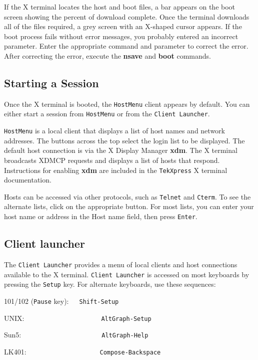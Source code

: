 \documentclass[11pt]{article}
\begin{document}
If the X terminal locates the host and boot files, a bar appears on the boot
screen showing the percent of download complete. Once the terminal downloads
all of the files required, a grey screen with an X-shaped cursor appears. If
the boot process fails without error messages, you probably entered an
incorrect parameter. Enter the appropriate command and parameter to correct
the error. After correcting the error, execute the {\bf nsave} and {\bf boot}
commands.


\subsection {Starting a Session}

Once the X terminal is booted, the {\tt HostMenu} client appears by default.
You can either start a session from {\tt HostMenu} or from the
{\tt Client Launcher}.

{\tt HostMenu} is a local client that displays a list of host names and
network addresses. The buttons across the top select the login list to be
displayed. The default host connection is via the X Display Manager {\bf xdm}.
The X terminal broadcasts XDMCP requests and displays a list of hosts that
respond. Instructions for enabling {\bf xdm} are included in the {\tt TekXpress}
X terminal documentation.

Hosts can be accessed via other protocols, such as {\tt Telnet} and {\tt Cterm}.
To see the alternate lists, click on the appropriate button. For most lists, you
can enter your host name or address in the Host name field, then press
{\tt Enter}.


\subsection {Client launcher}

The {\tt Client Launcher} provides a menu of local clients and host connections
available to the X terminal. {\tt Client Launcher} is accessed on most keyboards
by pressing the {\tt Setup} key. For alternate keyboards, use these sequences:

101/102 ({\tt Pause} key):\ \ \ {\tt Shift-Setup}

UNIX:\ \ \ \ \ \ \ \ \ \ \ \ \ \ \ \ \ \ \ \ \ \ {\tt AltGraph-Setup}

Sun5:\ \ \ \ \ \ \ \ \ \ \ \ \ \ \ \ \ \ \ \ \ \ \ {\tt AltGraph-Help}

LK401:\ \ \ \ \ \ \ \ \ \ \ \ \ \ \ \ \ \ \ \ \ {\tt Compose-Backspace}
\end{document}
